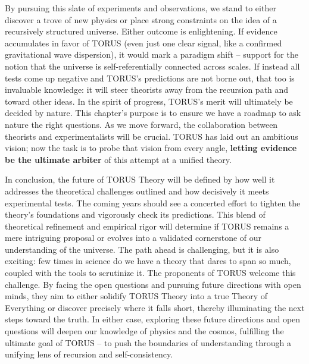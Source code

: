 \documentclass[
]{article}
\begin{document}
By pursuing this slate of experiments and observations, we stand to
either discover a trove of new physics or place strong constraints on
the idea of a recursively structured universe. Either outcome is
enlightening. If evidence accumulates in favor of TORUS (even just one
clear signal, like a confirmed gravitational wave dispersion), it would
mark a paradigm shift -- support for the notion that the universe is
self-referentially connected across scales. If instead all tests come up
negative and TORUS's predictions are not borne out, that too is
invaluable knowledge: it will steer theorists away from the recursion
path and toward other ideas. In the spirit of progress, TORUS's merit
will ultimately be decided by nature. This chapter's purpose is to
ensure we have a roadmap to ask nature the right questions. As we move
forward, the collaboration between theorists and experimentalists will
be crucial. TORUS has laid out an ambitious vision; now the task is to
probe that vision from every angle, \textbf{letting evidence be the
ultimate arbiter} of this attempt at a unified theory.

In conclusion, the future of TORUS Theory will be defined by how well it
addresses the theoretical challenges outlined and how decisively it
meets experimental tests. The coming years should see a concerted effort
to tighten the theory's foundations and vigorously check its
predictions. This blend of theoretical refinement and empirical rigor
will determine if TORUS remains a mere intriguing proposal or evolves
into a validated cornerstone of our understanding of the universe. The
path ahead is challenging, but it is also exciting: few times in science
do we have a theory that dares to span so much, coupled with the tools
to scrutinize it. The proponents of TORUS welcome this challenge. By
facing the open questions and pursuing future directions with open
minds, they aim to either solidify TORUS Theory into a true Theory of
Everything or discover precisely where it falls short, thereby
illuminating the next steps toward the truth. In either case, exploring
these future directions and open questions will deepen our knowledge of
physics and the cosmos, fulfilling the ultimate goal of TORUS -- to push
the boundaries of understanding through a unifying lens of recursion and
self-consistency.
\end{document}
